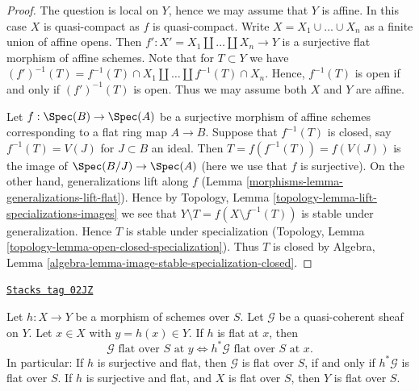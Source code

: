 \begin{proof}

The question is local on $Y$, hence we may assume that $Y$ is affine.
In this case $X$ is quasi-compact as $f$ is quasi-compact.
Write $X = X_1 \cup \ldots \cup X_n$ as a finite union of affine opens.
Then $f' : X' = X_1 \amalg \ldots \amalg X_n \to Y$ is a surjective
flat morphism of affine schemes. Note that for $T \subset Y$ we have
$(f')^{-1}(T) = f^{-1}(T) \cap X_1 \amalg \ldots \amalg f^{-1}(T) \cap X_n$.
Hence, $f^{-1}(T)$ is open if and only if $(f')^{-1}(T)$ is open.
Thus we may assume both $X$ and $Y$ are affine.

\medskip\noindent
Let $f : \Spec(B) \to \Spec(A)$ be a surjective morphism of affine schemes
corresponding to a flat ring map $A \to B$. Suppose that $f^{-1}(T)$ is
closed, say $f^{-1}(T) = V(J)$ for $J \subset B$ an ideal. Then
$T = f(f^{-1}(T)) = f(V(J))$ is the image of $\Spec(B/J) \to \Spec(A)$
(here we use that $f$ is surjective). On the other hand, generalizations
lift along $f$ (Lemma \ref{morphisms-lemma-generalizations-lift-flat}).
Hence by Topology, Lemma \ref{topology-lemma-lift-specializations-images}
we see that $Y \setminus T = f(X \setminus f^{-1}(T))$ is stable under
generalization. Hence $T$ is stable under specialization
(Topology, Lemma \ref{topology-lemma-open-closed-specialization}).
Thus $T$ is closed by
Algebra, Lemma \ref{algebra-lemma-image-stable-specialization-closed}.
\end{proof}

\begin{lemma}
\label{morphisms-lemma-flat-permanence}
\href{https://stacks.math.columbia.edu/tag/02JZ}{\texttt{Stacks tag 02JZ}}

Let $h : X \to Y$ be a morphism of schemes over $S$.
Let $\mathcal{G}$ be a quasi-coherent sheaf on $Y$.
Let $x \in X$ with $y = h(x) \in Y$. If $h$ is flat at $x$, then
$$
\mathcal{G}\text{ flat over }S\text{ at }y
\Leftrightarrow
h^*\mathcal{G}\text{ flat over }S\text{ at }x.
$$
In particular: If $h$ is surjective and flat, then
$\mathcal{G}$ is flat over $S$, if and only if
$h^*\mathcal{G}$ is flat over $S$. If $h$ is surjective and
flat, and $X$ is flat over $S$, then $Y$ is flat over $S$.
\end{lemma}


